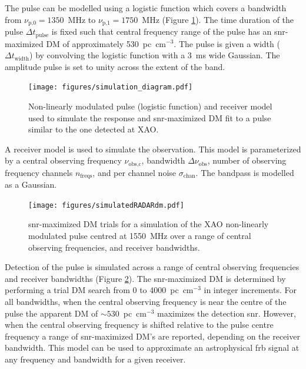 \documentclass[a4paper,fleqn,usenatbib]{mnras}
\begin{document}
The pulse can be modelled using a logistic function which covers a bandwidth from
$\nu_{\textrm{p,0}} = 1350$~MHz to $\nu_{\textrm{p,1}} = 1750$~MHz (Figure
\ref{fig:xao_simulation_diagram}). The time duration of the pulse $\Delta
t_{\textrm{pulse}}$ is fixed such that central frequency range of the pulse has
an \gls{snr}-maximized DM of approximately 530~pc~cm$^{-3}$. The pulse is given
a width ($\Delta t_{\textrm{width}}$) by convolving the logistic function with a
3~ms wide Gaussian. The amplitude pulse is set to unity across the extent of the
band.

\begin{figure}
    \texttt{[image: figures/simulation\_diagram.pdf]}
    \caption{Non-linearly modulated pulse (logistic function) and receiver model
    used to simulate the response and \gls{snr}-maximized DM fit to a pulse
    similar to the one detected at XAO.
    }
    \label{fig:xao_simulation_diagram}
\end{figure}

A receiver model is used to simulate the observation. This model is
parameterized by a central observing frequency $\nu_{\textrm{obs,c}}$, bandwidth
$\Delta \nu_{\textrm{obs}}$, number of observing frequency channels
$n_{\textrm{freqs}}$, and per channel noise $\sigma_{\textrm{chan}}$. The
bandpass is modelled as a Gaussian.

\begin{figure}
    \texttt{[image: figures/simulatedRADARdm.pdf]}
    \caption{\gls{snr}-maximized DM trials for a simulation of the XAO
    non-linearly modulated pulse centred at 1550~MHz over a range of central
    observing frequencies, and receiver bandwidths.
    }
    \label{fig:xao_simulated_dm}
\end{figure}

Detection of the pulse is simulated across a range of central observing
frequencies and receiver bandwidths (Figure \ref{fig:xao_simulated_dm}). The
\gls{snr}-maximized DM is determined by performing a trial DM search from 0 to
4000~pc~cm$^{-3}$ in integer increments.  For all bandwidths, when the central
observing frequency is near the centre of the pulse the apparent DM of
$\sim530$~pc~cm$^{-3}$ maximizes the detection \gls{snr}. However, when the
central observing frequency is shifted relative to the pulse centre frequency a
range of \gls{snr}-maximized DM's are reported, depending on the receiver
bandwidth. This model can be used to approximate an astrophysical \gls{frb}
signal at any frequency and bandwidth for a given receiver.
\end{document}
